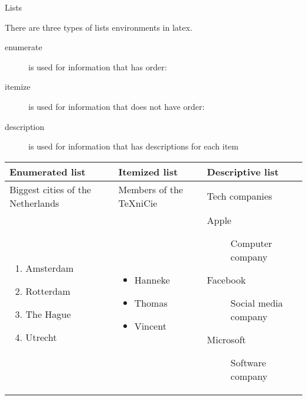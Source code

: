 \begin{frame}[fragile]{Lists}

There are three types of lists environments in latex.


\begin{description}
	\item[enumerate]  is used for information that has order:
	\item[itemize] is used for information that does not have order:
	\item[description] is used for information that has descriptions for each item
\end{description}
	\begin{tcolorbox}[width=13cm, title={Examples}, size=small]
	\begin{tabular}{m{3cm}| m{3cm} | m{5cm}}
		\textbf{Enumerated list} & \textbf{Itemized list} & \textbf{Descriptive list}\\
		\hline
		Biggest cities of the Netherlands &Members of the TeXniCie &   Tech companies\\
		\hline
		\begin{enumerate}[label=\arabic*)]
			\item Amsterdam 
			\item Rotterdam
			\item The Hague
			\item Utrecht
		\end{enumerate}
		&
		\begin{itemize}[label=\textbullet]
			\item Hanneke 
			\item Thomas
			\item Vincent
		\end{itemize}
		& 
		\begin{description}
			\item[Apple] Computer company
			\item[Facebook] Social media company
			\item[Microsoft] Software company
		\end{description}
	\end{tabular}
	\end{tcolorbox}
\end{frame}
